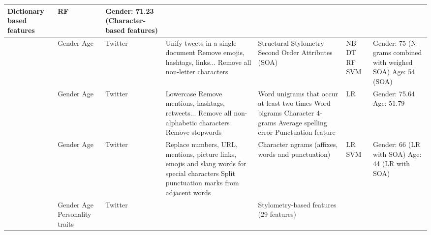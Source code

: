 \begin{longtable}{ p{} p{} p{} p{} p{} p{} p{}}
\newline Dictionary based features
& \acrshort{RF}
& Gender: 71.23 (Character-based features)
\\
\hline
\cite{bougiatiotis2016author} 
& Gender
\newline Age
& Twitter
& Unify tweets in a single document
\newline Remove emojis, hashtags, links...
\newline Remove all non-letter characters
& Structural
\newline Stylometry
\newline Second Order Attributes (SOA)
& \acrshort{NB}
\newline \acrshort{DT}
\newline \acrshort{RF}
\newline \acrshort{SVM}
& Gender: 75 (N-grams combined with weighed SOA)
\newline Age: 54 (SOA)
\\
\hline
\cite{modaresi2016exploring} 
& Gender
\newline Age
& Twitter
& Lowercase
\newline Remove mentions, hashtags, retweets...
\newline Remove all non-alphabetic characters
\newline Remove stopwords
& Word unigrams that occur at least two times
\newline Word bigrams
\newline Character 4-grams
\newline Average spelling error
\newline Punctuation feature
& \acrshort{LR}
& Gender: 75.64 
\newline Age: 51.79 
\\
\hline
\cite{markov2016adapting} 
& Gender
\newline Age
& Twitter
& Replace numbers, URL, mentions, picture links, emojis and slang words for special characters
\newline Split punctuation marks from adjacent words
& Character ngrams (affixes, words and punctuation)
& \acrshort{LR}
\newline \acrshort{SVM}
& Gender: 66 (\acrshort{LR} with SOA)
\newline Age: 44 (\acrshort{LR} with SOA) 
\\
\hline
\cite{ifrah2015identification} 
& Gender
\newline Age
\newline Personality traits
& Twitter
& 
& Stylometry-based features (29 features)

\end{longtable}
